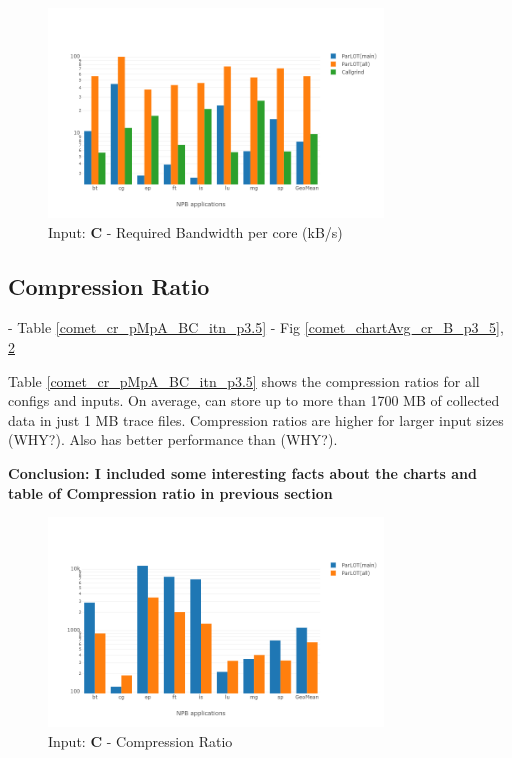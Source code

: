 \begin{figure}[!t]
\centering
\includegraphics[width=3.5in]{figs.comet.newMed/comet_chartAvg_bw_C_p3_5.png}
\caption{ Input: \textbf{C}  - Required Bandwidth per core (kB/s)
}
\label{comet_chartAvg_bw_C_p3_5}
\end{figure}


  
\subsection{Compression Ratio}
\label{subsec:cr}
 - Table \ref{comet_cr_pMpA_BC_itn_p3.5}
  - Fig \ref{comet_chartAvg_cr_B_p3_5}, \ref{comet_chartAvg_cr_C_p3_5}

  Table \ref{comet_cr_pMpA_BC_itn_p3.5} shows the compression ratios for all configs and inputs. On average, \parlot can store up to more than 1700 MB of collected data in just 1 MB trace files. Compression ratios are higher for larger input sizes (WHY?). Also \parlotm has better performance than \parlota (WHY?).
  
\textbf{Conclusion: I included some interesting facts about the charts and table of Compression ratio in previous section}



\begin{figure}[!t]
\centering
\includegraphics[width=3.5in]{figs.comet.newMed/comet_chartAvg_cr_C_p3_5.png}
\caption{ Input: \textbf{C}  - Compression Ratio
}
\label{comet_chartAvg_cr_C_p3_5}
\end{figure}


